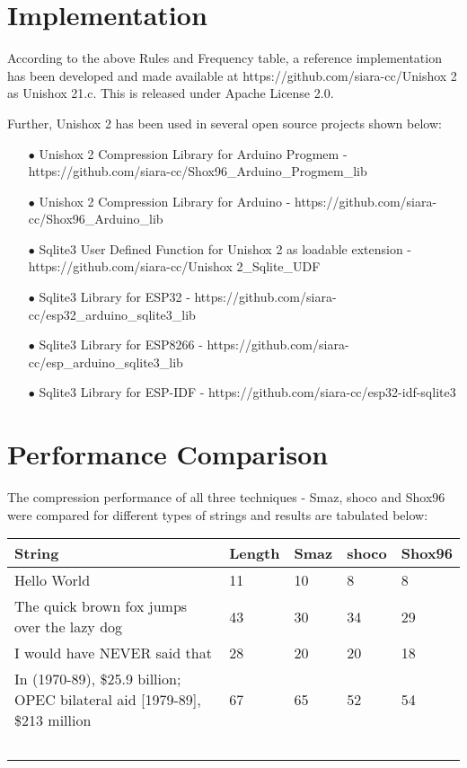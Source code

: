 \documentclass[]{article}
\begin{document}
\section{Implementation}

According to the above Rules and Frequency table, a reference implementation has been developed and made available at https://github.com/siara-cc/Unishox 2 as Unishox 21.c.  This is released under Apache License 2.0.

Further, Unishox 2 has been used in several open source projects shown below:

\begin{itemize}
	\item[$\bullet$] Unishox 2 Compression Library for Arduino Progmem - https://github.com/siara-cc/Shox96\_Arduino\_Progmem\_lib
	\item[$\bullet$] Unishox 2 Compression Library for Arduino - https://github.com/siara-cc/Shox96\_Arduino\_lib
	\item[$\bullet$] Sqlite3 User Defined Function for Unishox 2 as loadable extension - https://github.com/siara-cc/Unishox 2\_Sqlite\_UDF
	\item[$\bullet$] Sqlite3 Library for ESP32 - https://github.com/siara-cc/esp32\_arduino\_sqlite3\_lib
	\item[$\bullet$] Sqlite3 Library for ESP8266 - https://github.com/siara-cc/esp\_arduino\_sqlite3\_lib
	\item[$\bullet$] Sqlite3 Library for ESP-IDF - https://github.com/siara-cc/esp32-idf-sqlite3
\end{itemize}

\section{Performance Comparison}

The compression performance of all three techniques - Smaz, shoco and Shox96 were compared for different types of strings and results are tabulated below:

\begin{center}
\begin{tabular}{ | p{} | p{} | p{} | p{} | p{} |} \hline
﻿\textbf{String} & ﻿\textbf{Length} & ﻿\textbf{Smaz} & ﻿\textbf{shoco} & ﻿\textbf{Shox96} \\ \hline
Hello World & 11 & 10 & 8 & 8 \\ \hline
The quick brown fox jumps over the lazy dog & 43 & 30 & 34 & 29 \\ \hline
I would have NEVER said that & 28 & 20 & 20 & 18 \\ \hline
In (1970-89), \$25.9 billion; OPEC bilateral aid [1979-89], \$213 million & 67 & 65 & 52 & 54 \\ \hline
	﻿\end{tabular}
\end{center}
\end{document}
